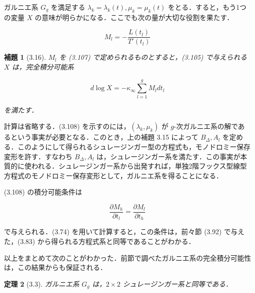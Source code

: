 \documentclass[paper=a4, fontsize=11pt]{jlreq} %
\newenvironment{story}{%
  \begin{mdframed}[
    backgroundcolor=red!5, %
    linewidth=0pt,         %
    innertopmargin=10pt,   %
    innerbottommargin=10pt,
    innerrightmargin=10pt, %
    innerleftmargin=10pt
  ]%
}{%
  \end{mdframed}%
}
\theoremstyle{break}
\newtheorem{theorem}{定理}[section]
\newtheorem{lemma}[theorem]{補題}
\theoremstyle{qa}
\begin{document}
\begin{story}
ガルニエ系 $G_g$ を満足する $\lambda_k = \lambda_k(t), \mu_k = \mu_k(t)$ をとる．すると，もう1つの変量 $X$ の意味が明らかになる．ここでも次の量が大切な役割を果たす．

\begin{equation} \tag{3.107}
    M_l = -\frac{L(t_l)}{T'(t_l)}
\end{equation}

\begin{lemma}[3.16]
$M_l$ を (3.107) で定められるものとすると，(3.105) で与えられる $X$ は，完全積分可能系

\begin{equation} \tag{3.108}
    d \log X = -\kappa_\infty \sum_{l=1}^g M_l dt_l
\end{equation}

を満たす．
\end{lemma}

計算は省略する．(3.108) を示すのには，$(\lambda_k, \mu_k)$ が $g$-次ガルニエ系の解であるという事実が必要となる．このとき，上の補題 3.15 によって $B_\Delta, A_l$ を定める．このようにして得られるシュレージンガー型の方程式も，モノドロミー保存変形を許す．すなわち $B_\Delta, A_l$ は，シュレージンガー系を満たす．この事実が本質的に使われる．シュレージンガー系から出発すれば，単独2階フックス型線型方程式のモノドロミー保存変形として，ガルニエ系を得ることになる．

(3.108) の積分可能条件は

\begin{equation} \tag{3.109}
    \frac{\partial M_h}{\partial t_l} = \frac{\partial M_l}{\partial t_h}
\end{equation}

で与えられる．(3.74) を用いて計算すると，この条件は，前々節 (3.92) で与えた，(3.83) から得られる方程式系と同等であることがわかる．

以上をまとめて次のことがわかった．前節で調べたガルニエ系の完全積分可能性は，この結果からも保証される．

\begin{theorem}[3.3]
ガルニエ系 $G_g$ は，$2 \times 2$ シュレージンガー系と同等である．
\end{theorem}

\end{story}
\end{document}
